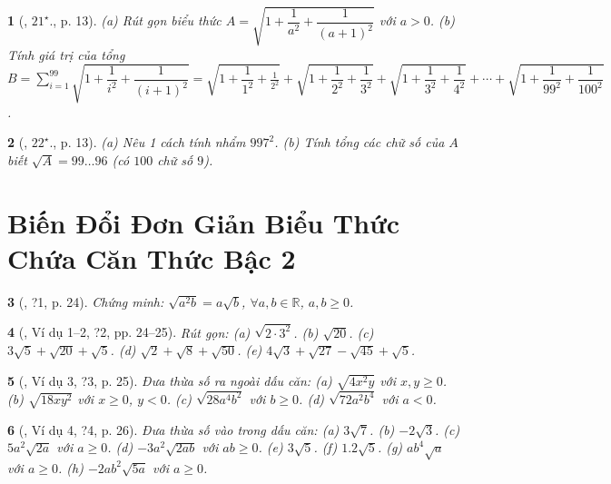 \documentclass{article}
\newtheorem{baitoan}{}%
\begin{document}
\begin{baitoan}[\cite{Binh_Toan_9_tap_1}, $21^\star$., p. 13]
	(a) Rút gọn biểu thức $A = \sqrt{1 + \dfrac{1}{a^2} + \dfrac{1}{(a + 1)^2}}$ với $a > 0$. (b) Tính giá trị của tổng $B = \sum_{i=1}^{99} \sqrt{1 + \dfrac{1}{i^2} + \dfrac{1}{(i + 1)^2}} = \sqrt{1 + \dfrac{1}{1^2} + \frac{1}{2^2}} + \sqrt{1 + \dfrac{1}{2^2} + \dfrac{1}{3^2}} + \sqrt{1 + \dfrac{1}{3^2} + \dfrac{1}{4^2}} + \cdots + \sqrt{1 + \dfrac{1}{99^2} + \dfrac{1}{100^2}}$.
\end{baitoan}

\begin{baitoan}[\cite{Binh_Toan_9_tap_1}, $22^\star$., p. 13]
	(a) Nêu 1 cách tính nhẩm $997^2$. (b) Tính tổng các chữ số của $A$ biết $\sqrt{A} = 99\ldots96$ (có $100$ chữ số $9$).
\end{baitoan}


\section{Biến Đổi Đơn Giản Biểu Thức Chứa Căn Thức Bậc 2}

\begin{baitoan}[\cite{SGK_Toan_9_tap_1}, ?1, p. 24]
	Chứng minh: $\sqrt{a^2b} = a\sqrt{b}$, $\forall a,b\in\mathbb{R}$, $a,b\ge0$.
\end{baitoan}

\begin{baitoan}[\cite{SGK_Toan_9_tap_1}, Ví dụ 1--2, ?2, pp. 24--25]
	Rút gọn: (a) $\sqrt{2\cdot3^2}$. (b) $\sqrt{20}$. (c) $3\sqrt{5} + \sqrt{20} + \sqrt{5}$. (d) $\sqrt{2} + \sqrt{8} + \sqrt{50}$. (e) $4\sqrt{3} + \sqrt{27} - \sqrt{45} + \sqrt{5}$.
\end{baitoan}

\begin{baitoan}[\cite{SGK_Toan_9_tap_1}, Ví dụ 3, ?3, p. 25]
	Đưa thừa số ra ngoài dấu căn: (a) $\sqrt{4x^2y}$ với $x,y\ge0$. (b) $\sqrt{18xy^2}$ với $x\ge0$, $y < 0$. (c) $\sqrt{28a^4b^2}$ với $b\ge0$. (d) $\sqrt{72a^2b^4}$ với $a < 0$.
\end{baitoan}

\begin{baitoan}[\cite{SGK_Toan_9_tap_1}, Ví dụ 4, ?4, p. 26]
	Đưa thừa số vào trong dấu căn: (a) $3\sqrt{7}$. (b) $-2\sqrt{3}$. (c) $5a^2\sqrt{2a}$ với $a\ge0$. (d) $-3a^2\sqrt{2ab}$ với $ab\ge0$. (e) $3\sqrt{5}$. (f) $1.2\sqrt{5}$. (g) $ab^4\sqrt{a}$ với $a\ge0$. (h) $-2ab^2\sqrt{5a}$ với $a\ge0$.
\end{baitoan}
\end{document}
